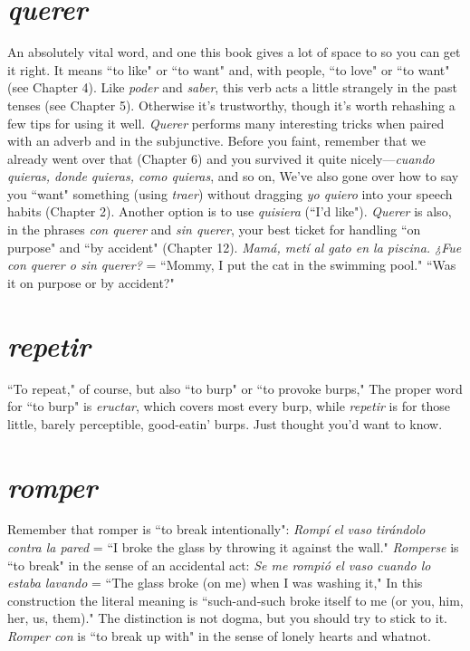 \section{\emph{querer}}

An absolutely vital word, and one this book gives a lot of space
to so you can get it right. It means ``to like" or ``to want" and, with
people, ``to love" or ``to want" (see Chapter 4). Like \emph{poder} and \emph{saber},
this verb acts a little strangely in the past tenses (see Chapter 5). Otherwise it's trustworthy, though it's worth rehashing a few tips for using
it well. \emph{Querer} performs many interesting tricks when paired with an
adverb and in the subjunctive. Before you faint, remember that we already went over that (Chapter 6) and you survived it quite nicely---\emph{cuando quieras, donde quieras, como quieras}, and so on, We've also
gone over how to say you ``want" something (using \emph{traer}) without
dragging \emph{yo quiero} into your speech habits (Chapter 2). Another option
is to use \emph{quisiera} (``I'd like"). \emph{Querer} is also, in the phrases \emph{con querer}
and \emph{sin querer}, your best ticket for handling ``on purpose" and ``by
accident" (Chapter 12). \emph{Mamá, metí al gato en la piscina. ¿Fue con
	querer o sin querer?} = ``Mommy, I put the cat in the swimming pool."
``Was it on purpose or by accident?"

\section{\emph{repetir}}

``To repeat," of course, but also ``to burp" or ``to provoke
burps," The proper word for ``to burp" is \emph{eructar}, which covers most
every burp, while \emph{repetir} is for those little, barely perceptible, good-eatin' burps. Just thought you'd want to know.

\section{\emph{romper}}

Remember that romper is ``to break intentionally": \emph{Rompí
	el vaso tirándolo contra la pared} = ``I broke the glass by throwing it
against the wall." \emph{Romperse} is ``to break" in the sense of an accidental
act: \emph{Se me rompió el vaso cuando lo estaba lavando} = ``The glass
broke (on me) when I was washing it," In this construction the literal
meaning is ``such-and-such broke itself to me (or you, him, her, us,
them)." The distinction is not dogma, but you should try to stick to
it. \emph{Romper con} is ``to break up with" in the sense of lonely hearts and
whatnot.

